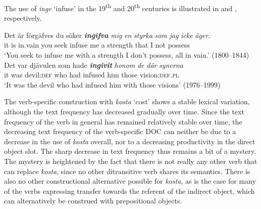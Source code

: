 \documentclass[output=paper]{langscibook}
\begin{document}
The use of \textit{inge} ‘infuse’ in the 19\textsuperscript{th} and 20\textsuperscript{th} centuries is illustrated in  and , respectively.


\ea \label{ex:valdeson:24}
\gll Det   är förgäfves du   söker \textbf{\textit{ingifva}} \textit{mig} \textit{en} \textit{styrka} \textit{som} \textit{jag} \textit{icke} \textit{äger}.\\
  it       is    in.vain     you   seek     infuse       me   a   strength that   I   not   possess\\
\glt `You seek to infuse me with a strength I don’t possess, all in vain.’ (1800–1844)
\ex \label{ex:valdeson:25}
\gll Det var djävulen     som   hade \textbf{\textit{ingivit}} \textit{honom} {\textit{de} \textit{där}} \textit{synerna}\\
  it     was devil:\textsc{def}   who     had     infused   him     those      vision:\textsc{def.pl}\\
\glt `It was the devil who had infused him with those visions’ (1976–1999)
\z


\label{sec:valdeson:5.3.3.4}



The verb-specific construction with \textit{kosta} ‘cost’ shows a stable lexical variation, although the text frequency has decreased gradually over time. Since the text frequency of the verb in general has remained relatively stable over time, the decreasing text frequency of the verb-specific DOC can neither be due to a decrease in the use of \textit{kosta} overall, nor to a decreasing productivity in the direct object slot. The sharp decrease in text frequency thus remains a bit of a mystery. The mystery is heightened by the fact that there is not really any other verb that can replace \textit{kosta}, since no other ditransitive verb shares its semantics. There is also no other constructional alternative possible for \textit{kosta}, as is the case for many of the verbs expressing transfer towards the referent of the indirect object, which can alternatively be construed with prepositional objects.


\begin{table}
\caption{Frequency measures of the verb-specific DOC with \textit{kosta} ‘cost’}
\label{tab:valdeson:17}
\end{table}
\end{document}
